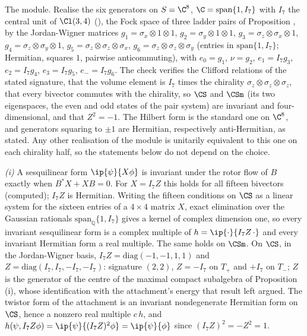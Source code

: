The module. Realise the six generators on $S = \C^{8}$, $\C = \mathrm{span}\{1, I_{7}\}$ with $I_{7}$ the central unit of $\Cl(3,4)$ (), the Fock space of three ladder pairs of Proposition , by the Jordan-Wigner matrices $g_{1} = \sigma_{x}\otimes 1\otimes 1$, $g_{2} = \sigma_{y}\otimes 1\otimes 1$, $g_{3} = \sigma_{z}\otimes\sigma_{x}\otimes 1$, $g_{4} = \sigma_{z}\otimes\sigma_{y}\otimes 1$, $g_{5} = \sigma_{z}\otimes\sigma_{z}\otimes\sigma_{x}$, $g_{6} = \sigma_{z}\otimes\sigma_{z}\otimes\sigma_{y}$ (entries in $\mathrm{span}\{1, I_{7}\}$; Hermitian, squares $1$, pairwise anticommuting), with $e_{0} = g_{1}$, $\nu = g_{2}$, $e_{1} = I_{7}g_{3}$, $e_{2} = I_{7}g_{4}$, $e_{3} = I_{7}g_{5}$, $e_{-} = I_{7}g_{6}$. The check verifies the Clifford relations of the stated signature, that the volume element is $I_{7}$ times the chirality $\sigma_{z}\otimes\sigma_{z}\otimes\sigma_{z}$, that every bivector commutes with the chirality, so $\CS$ and $\CSm$ (its two eigenspaces, the even and odd states of the pair system) are invariant and four-dimensional, and that $Z^{2} = -1$. The Hilbert form is the standard one on $\C^{8}$, and generators squaring to $\pm 1$ are Hermitian, respectively anti-Hermitian, as stated. Any other realisation of the module is unitarily equivalent to this one on each chirality half, so the statements below do not depend on the choice.

\emph{(i)} A sesquilinear form $\ip{\psi}{X\phi}$ is invariant under the rotor flow of $B$ exactly when $B^{*}X + XB = 0$. For $X = I_{7}Z$ this holds for all fifteen bivectors (computed); $I_{7}Z$ is Hermitian. Writing the fifteen conditions on $\CS$ as a linear system for the sixteen entries of a $4\times 4$ matrix $X$, exact elimination over the Gaussian rationals $\mathrm{span}_{\mathbb{Q}}\{1, I_{7}\}$ gives a kernel of complex dimension one, so every invariant sesquilinear form is a complex multiple of $h = \ip{\cdot}{I_{7}Z\,\cdot}$ and every invariant Hermitian form a real multiple. The same holds on $\CSm$. On $\CS$, in the Jordan-Wigner basis, $I_{7}Z = \mathrm{diag}(-1, -1, 1, 1)$ and $Z = \mathrm{diag}(I_{7}, I_{7}, -I_{7}, -I_{7})$: signature $(2,2)$, $Z = -I_{7}$ on $T_{+}$ and $+I_{7}$ on $T_{-}$; $Z$ is the generator of the centre of the maximal compact subalgebra of Proposition (i), whose identification with the attachment's energy that result left argued. The twistor form of the attachment is an invariant nondegenerate Hermitian form on $\CS$, hence a nonzero real multiple $c\,h$, and $h(\psi, I_{7}Z\phi) = \ip{\psi}{(I_{7}Z)^{2}\phi} = \ip{\psi}{\phi}$ since $(I_{7}Z)^{2} = -Z^{2} = 1$.

